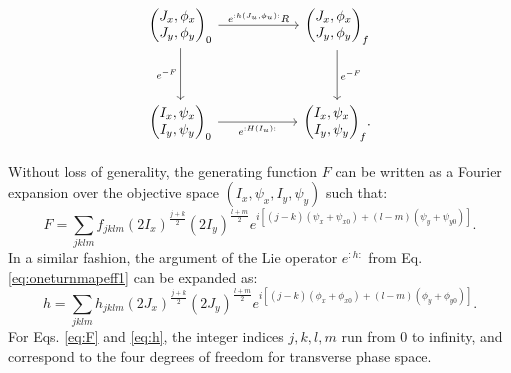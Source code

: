 \begin{equation}\begin{tikzcd}
	{\begin{pmatrix} J_x,\phi_x \\ J_y,\phi_y \end{pmatrix}_0} & {} & {\begin{pmatrix} J_x,\phi_x \\ J_y,\phi_y \end{pmatrix}_{f}} \\
	\\
	{\begin{pmatrix} I_x,\psi_x \\ I_y,\psi_y \end{pmatrix}_0} && {\begin{pmatrix} I_x,\psi_x \\ I_y,\psi_y \end{pmatrix}_{f}}
	\arrow["{e^{:h(J_u,\phi_u):}R}", from=1-1, to=1-3]
	\arrow["{e^{-F}}"', from=1-1, to=3-1]
	\arrow["{e^{:H(I_u):}}"', from=3-1, to=3-3]
	\arrow["{e^{-F}}", from=1-3, to=3-3]
    .
\end{tikzcd}\end{equation}

Without loss of generality, the generating function $F$ can be written as a Fourier expansion over the objective space $(I_x,\psi_x,I_y,\psi_y)$ such that:
\begin{equation}
    \label{eq:F}
    F=\sum_{jklm} f_{jklm} \left( 2 I_x\right)^{\frac{j+k}{2}} \left( 2 I_y\right)^{\frac{l+m}{2}} e^{i\left[ \left( j-k \right)\left( \psi_x+\psi_{x0} \right)+ \left( l-m \right) \left( \psi_y+\psi_{y0} \right)\right]}.
\end{equation}
In a similar fashion, the argument of the Lie operator $e^{:h:}$ from Eq. \ref{eq:oneturnmapeff1} can be expanded as:
\begin{equation}
    \label{eq:h}
    h=\sum_{jklm} h_{jklm} \left( 2 J_x\right)^{\frac{j+k}{2}} \left( 2 J_y\right)^{\frac{l+m}{2}} e^{i\left[ \left( j-k \right)\left( \phi_x+\phi_{x0} \right)+ \left( l-m \right) \left( \phi_y+\phi_{y0} \right)\right]}.
\end{equation}
For Eqs. \ref{eq:F} and \ref{eq:h}, the integer indices $j,k,l,m$ run from $0$ to infinity, and correspond to the four degrees of freedom for transverse phase space.   

